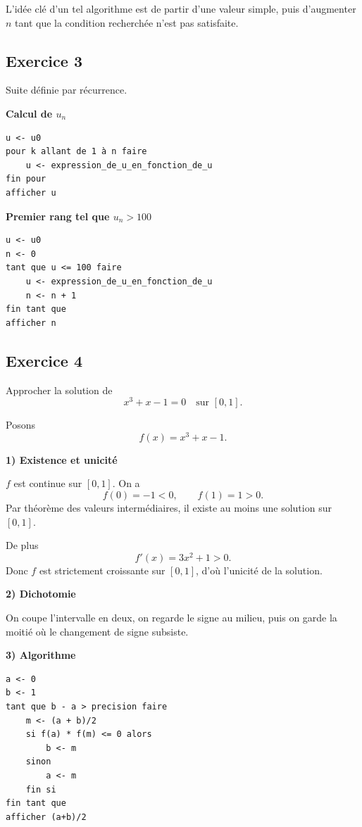 \documentclass[11pt,a4paper]{article}
\begin{document}
\begin{logiquebox}
L'idée clé d'un tel algorithme est de partir d'une valeur simple, puis d'augmenter \(n\) tant que la condition recherchée n'est pas satisfaite.
\end{logiquebox}

\subsection*{Exercice 3}
Suite définie par récurrence.

\textbf{Calcul de \(u_n\)}

\begin{verbatim}
u <- u0
pour k allant de 1 à n faire
    u <- expression_de_u_en_fonction_de_u
fin pour
afficher u
\end{verbatim}

\textbf{Premier rang tel que \(u_n>100\)}

\begin{verbatim}
u <- u0
n <- 0
tant que u <= 100 faire
    u <- expression_de_u_en_fonction_de_u
    n <- n + 1
fin tant que
afficher n
\end{verbatim}

\subsection*{Exercice 4}
Approcher la solution de
\[
x^3+x-1=0
\quad \text{sur } [0,1].
\]

Posons
\[
f(x)=x^3+x-1.
\]

\textbf{1) Existence et unicité}

\(f\) est continue sur \([0,1]\).  
On a
\[
f(0)=-1<0,\qquad f(1)=1>0.
\]
Par théorème des valeurs intermédiaires, il existe au moins une solution sur \([0,1]\).

De plus
\[
f'(x)=3x^2+1>0.
\]
Donc \(f\) est strictement croissante sur \([0,1]\), d'où l'unicité de la solution.

\textbf{2) Dichotomie}

On coupe l'intervalle en deux, on regarde le signe au milieu, puis on garde la moitié où le changement de signe subsiste.

\textbf{3) Algorithme}

\begin{verbatim}
a <- 0
b <- 1
tant que b - a > precision faire
    m <- (a + b)/2
    si f(a) * f(m) <= 0 alors
        b <- m
    sinon
        a <- m
    fin si
fin tant que
afficher (a+b)/2
\end{verbatim}
\end{document}
